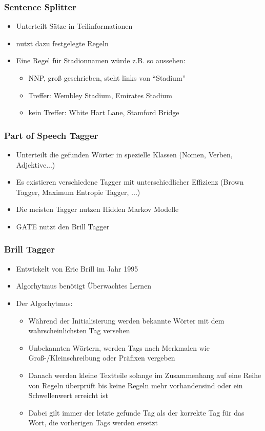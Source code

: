 \begin{frame}
  \frametitle{Sentence Splitter}
  \begin{itemize}
  \item Unterteilt Sätze in Teilinformationen
  \item nutzt dazu festgelegte Regeln
  \item Eine Regel für Stadionnamen würde z.B. so aussehen: 
    \begin{itemize}
    \item NNP, groß geschrieben, steht links von ``Stadium''
    \item Treffer: Wembley Stadium, Emirates Stadium
    \item kein Treffer: White Hart Lane, Stamford Bridge
    \end{itemize}
  \end{itemize}
\end{frame}

\begin{frame}
  \frametitle{Part of Speech Tagger}
  \begin{itemize}
  \item Unterteilt die gefunden Wörter in spezielle Klassen (Nomen, Verben, Adjektive...)
  \item Es existieren verschiedene Tagger mit unterschiedlicher Effizienz (Brown Tagger, Maximum Entropie Tagger, ...)
  \item Die meisten Tagger nutzen Hidden Markov Modelle
  \item GATE nutzt den Brill Tagger
  \end{itemize}
\end{frame}

\begin{frame}
  \frametitle{Brill Tagger}
  \begin{itemize}
  \item Entwickelt von Eric Brill im Jahr 1995
  \item Algorhytmus benötigt Überwachtes Lernen
  \item Der Algorhytmus:
    \begin{itemize}
    \item Während der Initialisierung werden bekannte Wörter mit dem wahrscheinlichsten Tag versehen 
    \item Unbekannten Wörtern, werden Tags nach Merkmalen wie Groß-/Kleinschreibung oder Präfixen vergeben
    \item Danach werden kleine Textteile solange im Zusammenhang auf eine Reihe von Regeln überprüft bis keine Regeln mehr vorhandensind oder ein Schwellenwert erreicht ist
    \item Dabei gilt immer der letzte gefunde Tag als der korrekte Tag für das Wort, die vorherigen Tags werden ersetzt
    \end{itemize}
  \end{itemize}
\end{frame}

